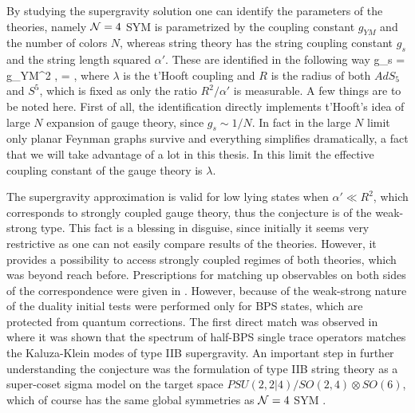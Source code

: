 By studying the supergravity solution one can identify the parameters of the theories, namely $\mathcal{N}=4$ SYM is parametrized by the coupling constant $g_{YM}$ and the number of colors $N$, whereas string theory has the string coupling constant $g_s$ and the string length squared $\alpha'$. 
These are identified in the following way
\pi g_s = g_{YM}^2 \equiv {}, \;\;\;\;\;\;\;  = \lambda,
\eeq
where $\lambda$ is the t'Hooft coupling and $R$ is the radius of both $AdS_5$ and $S^5$, which is fixed as only the ratio $R^2/\alpha'$ is measurable.
A few things are to be noted here. First of all, the identification directly implements t'Hooft's idea of large $N$ expansion of gauge theory, since $g_s \sim 1/N$. 
In fact in the large $N$ limit only planar Feynman graphs survive and everything simplifies dramatically, a fact that we will take advantage of a lot in this thesis.
In this limit the effective coupling constant of the gauge theory is $\lambda$. 

The supergravity approximation is valid for low lying states when $\alpha' \ll R^2$, which corresponds to strongly coupled gauge theory, thus the conjecture is of the weak-strong type. 
This fact is a blessing in disguise, since initially it seems very restrictive as one can not easily compare results of the theories. 
However, it provides a possibility to access strongly coupled regimes of both theories, which was beyond reach before. 
Prescriptions for matching up observables on both sides of the correspondence were given in \cite{Gubser:1998bc, Witten:1998qj}. 
However, because of the weak-strong nature of the duality initial tests were performed only for BPS states, which are protected from quantum corrections.
The first direct match was observed in \cite{Witten:1998qj} where it was shown that the spectrum of half-BPS single trace operators matches the Kaluza-Klein modes of type IIB supergravity.
An important step in further understanding the conjecture was the formulation of type IIB string theory as a super-coset sigma model on the target space $PSU(2,2|4) / SO(2,4) \otimes SO(6)$, which of course has the same global symmetries as $\mathcal{N}=4$ SYM \cite{Metsaev:1998it}.

